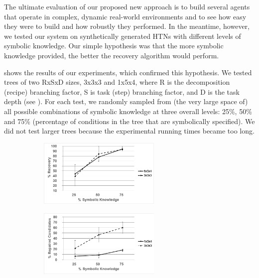 \documentclass{llncs}
\begin{document}
The ultimate evaluation of our proposed new approach is to
build several agents that operate in complex, dynamic real-world
environments and to see how easy they were to build and how robustly
they performed.  In the meantime, however, we tested our system
on synthetically generated HTNs with different levels of symbolic
knowledge.  Our simple hypothesis was that the more symbolic knowledge
provided, the better the recovery algorithm would perform.

 shows the results of our experiments, which confirmed
this hypothesis.  We tested trees of two RxSxD sizes, 3x3x3 and 1x5x4,
where R is the decomposition (recipe) branching factor, S is task
(step) branching factor, and D is the task depth (see ).
For each test, we randomly sampled from (the very large space of) all
possible combinations of symbolic knowledge at three overall levels:
25\%, 50\% and 75\% (percentage of conditions in the tree that are
symbolically specified).  We did not test larger trees because the
experimental running times became too long.

\begin{figure}[t]
\centering
\begin{subfigure}{2.3in}
\centerline{\includegraphics[width=2.3in]{figs/recovery}}
\vskip 8pt 
\end{subfigure}
\hfill
\begin{subfigure}{2.3in}
\centerline{\includegraphics[width=2.3in]{figs/candidates}}
\vskip 8pt 
\end{subfigure}
\vskip 6pt
 \end{figure}
\end{document}
